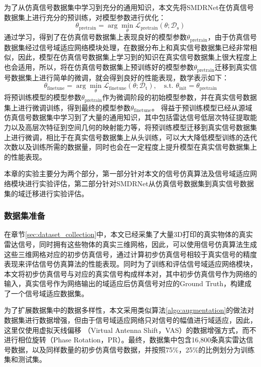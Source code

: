 为了从仿真信号数据集中学习到充分的通用知识，本文先将SMDRNet在仿真信号数据集上进行充分的预训练，对模型参数进行优化：
\begin{equation}
    \theta_{\text{pretrain}} = \arg\min_{\theta} \mathcal{L}_{\text{pretrain}}(\theta; \mathcal{D}_{\text{s}})
\end{equation}
通过学习，得到了在仿真信号数据集上表现良好的模型参数$\theta_{\text{pretrain}}$，由于仿真信号数据集经过信号域适应网络模块处理，在数据分布上和真实信号数据集已经非常相似，因此，模型在仿真信号数据集上学习到的知识在真实信号数据集上很大程度上也会适用，所以，将在仿真信号数据集上预训练好的模型参数$\theta_{\text{pretrain}}$迁移到真实信号数据集上进行简单的微调，就会得到良好的性能表现，数学表示如下：
\begin{equation}
    \theta_{\text{finetune}} = \arg\min_{\theta} \mathcal{L}_{\text{finetune}}(\theta; \mathcal{D}_{\text{t}}), \quad \text{s.t. } \theta_{\text{init}} = \theta_{\text{pretrain}}
\end{equation}
将预训练模型的模型参数$\theta_{\text{pretrain}}$作为微调阶段的初始模型参数，并在真实信号数据集上进行微调训练，得到最终的模型参数$\theta_{\text{finetune}}$。 得益于预训练模型已经从源域仿真信号数据集中学习到了大量的通用知识，其中包括雷达信号低层次特征提取能力以及高层次特征到空间几何的映射能力等，将预训练模型迁移到真实信号数据集上进行微调，相比于在真实信号数据集上从头训练，可以大大降低模型训练的迭代次数以及训练所需的数据量，同时也会在一定程度上提升模型在真实信号数据集上的性能表现。

本章的实验主要分为两个部分，第一部分针对本文的信号仿真算法及信号域适应网络模块进行实验评估，第二部分针对SMDRNet从仿真信号数据集到真实信号数据集的域迁移进行实验评估。
\subsubsection{数据集准备}
在章节\ref{sec:dataset_collection}中，本文已经采集了大量3D打印的真实物体的真实雷达信号，同时拥有这些物体的真实三维网格，因此，可以使用信号仿真算法生成这些三维网格对应的初步仿真信号，通过计算初步仿真信号相较于真实信号的精度表现来评估信号仿真算法的性能表现。同时为了训练和评估信号域适应网络模块，本文将初步仿真信号与对应的真实信号构成样本对，其中初步仿真信号作为网络的输入，真实信号作为网络输出的域适应后仿真信号对应的Ground Truth，构建成了一个信号域适应数据集。

为了扩展数据集中的数据多样性，本文采用类似算法\ref{algo:augmentation}的做法对数据集进行数据增强，但由于信号域适应网络只对信号的幅值进行域适应，因此，这里仅使用虚拟天线偏移 （Virtual Antenna Shift，VAS）的数据增强方式，而不进行相位旋转（Phase Rotation，PR）。最终，数据集中包含16,800条真实雷达信号数据，以及同样数量的初步仿真信号数据，并按照75\%，25\%的比例划分为训练集和测试集。
